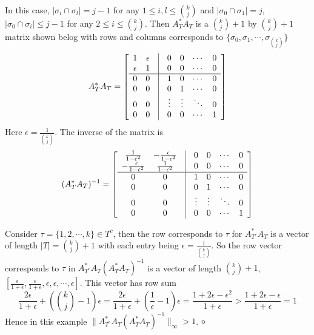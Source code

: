 \documentclass{article}
\begin{document}
In this case, $|\sigma_i\cap \sigma_l|=j-1$ for any $1\le i, l\le {k\choose j}$ and $|\sigma_0\cap \sigma_1|=j$, 
$|\sigma_0\cap \sigma_i|\le j-1$ for any $2\le i\le {k\choose j}$. Then 
$A^*_TA_T$ is a ${k\choose j}+1$ by ${k\choose j}+1$ matrix shown belog with rows and columns corresponds to 
$\{\sigma_0, \sigma_1, \cdots, \sigma_{{k\choose j}}\}$
\[ A^*_TA_T=\left[ \begin{array}{ccccccc}
1 & \epsilon & \vline & 0 & 0 & \cdots & 0\\
\epsilon & 1 & \vline & 0 & 0 & \cdots & 0\\\hline
0 & 0 & \vline & 1 & 0 & \cdots & 0\\
0 & 0 & \vline & 0 & 1 & \cdots & 0\\
0 & 0 & \vline & \vdots & \vdots & \ddots & 0\\
0 & 0 & \vline & 0 & 0 & \cdots & 1\\
\end{array} \right]\] 
Here $\epsilon=\frac{1}{{k\choose j}}$. The inverse of the matrix is
\[ (A^*_TA_T)^{-1}= \left[ \begin{array}{ccccccc}
\frac{1}{1-\epsilon^2} & -\frac{\epsilon}{1-\epsilon^2} & \vline & 0 & 0 & \cdots & 0\\
-\frac{\epsilon}{1-\epsilon^2} & \frac{1}{1-\epsilon^2} & \vline & 0 & 0 & \cdots & 0\\\hline
0 & 0 & \vline & 1 & 0 & \cdots & 0\\
0 & 0 & \vline & 0 & 1 & \cdots & 0\\
0 & 0 & \vline & \vdots & \vdots & \ddots & 0\\
0 & 0 & \vline & 0 & 0 & \cdots & 1\\
\end{array} \right]\] 

Consider $\tau=\{1,2,\cdots, k\}\in T^c$, then the row corresponds to $\tau$ for $A^*_{T^c}A_T$
is a vector of length $|T|={k\choose j}+1$ with each entry being $\epsilon=\frac{1}{{k\choose j}}$.
So the row vector corresponds to $\tau$ in $A^*_{T^c}A_T(A^*_TA_T)^{-1}$ is a vector of
length ${k\choose j}+1$, 
$[\frac{\epsilon}{1+\epsilon}, \frac{\epsilon}{1+\epsilon}, \epsilon, \epsilon, \cdots, \epsilon]$. 
This vector has row sum 
$$\frac{2\epsilon}{1+\epsilon}+({k\choose j}-1)\epsilon=\frac{2\epsilon}{1+\epsilon}+(
\frac{1}{\epsilon}-1)\epsilon=\frac{1+2\epsilon-\epsilon^2}{1+\epsilon}>\frac{1+2\epsilon-\epsilon}{1+\epsilon}=1$$
Hence in this example $\|A^*_{T^c}A_T (A^*_TA_T)^{-1}\|_\infty>1$. 
$\hfill\diamond$
\end{document}
